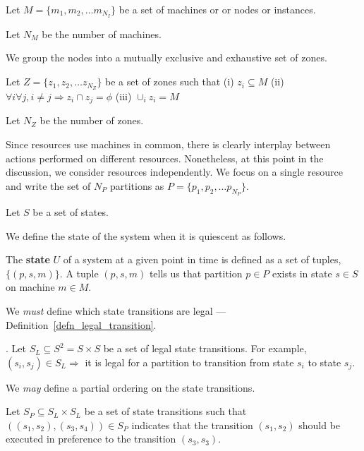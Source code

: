 \begin{definition}
Let \(M = \{m_1, m_2, \ldots m_{N_I}\}\) be a set of machines or 
or nodes or instances.  
\end{definition}

\begin{definition}
Let \(N_M\) be the number of machines.
\end{definition}

We group the nodes into a mutually exclusive and exhaustive set of zones.

\begin{definition}
Let \(Z = \{z_1, z_2, \ldots z_{N_Z}\}\) be a set of  zones such that 
(i) \(z_i \subseteq M\) 
(ii) \(\forall i \forall j , i \neq j \Rightarrow z_i \cap z_j = \phi \) 
(iii) \(\cup_i z_i = M\)
\end{definition}

\begin{definition}
Let \(N_Z\) be the number of zones.
\end{definition}

Since resources use machines in common, there is clearly interplay
between actions performed on different resources. Nonetheless, at this
point in the discussion, we consider resources independently. 
We focus on a single resource and write the set of \(N_P\) partitions 
as \(P = \{p_1, p_2, \ldots p_{N_P}\}\). 

\begin{definition}
\label{defn_states}
Let \(S\) be a set of states.  
\end{definition}

We define the state of the system when it is quiescent as follows.

\begin{definition}
\label{defn_q1_system_state}
The {\bf state} \(U\) of a system at a given point in time
is defined as a set of tuples, 
\(\{(p, s, m)\} \).  A tuple \((p, s, m)\) tells us that
partition \(p \in P\) exists in state \(s \in S\) on machine \(m \in M\). 
\end{definition}

We {\em must} define which state transitions are legal 
--- Definition~\ref{defn_legal_transition}.
\begin{definition}
\label{defn_legal_transition}.
Let \(S_L \subseteq S^2 =  S \times S\) be a set of
legal state transitions. For example, \((s_i, s_j) \in S_L
\Rightarrow\) it is legal for a partition to transition from state 
\(s_i\) to state \(s_j\).
\end{definition}
We {\em may} define a partial ordering on the state transitions.
\begin{definition}
\label{defn_state_trans_partial_order}
Let \(S_P \subseteq S_L \times S_L\) be a set of state transitions such
that \(((s_1, s_2), (s_3, s_4)) \in S_P\) indicates that the transition
\((s_1, s_2)\) should be executed in preference to the transition
\((s_3, s_3)\).
\end{definition}

